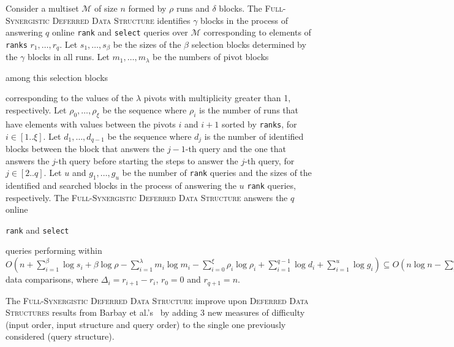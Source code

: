 \begin{INUTILE}
  \begin{theorem}\label{theo:finger}
    Consider a multiset $\mathcal{M}$ of size $n$ formed by $\rho$
    runs and $\delta$ blocks. The \textsc{Full-Synergistic Deferred
      Data Structure} identifies $\gamma$ blocks in the process of
    answering $q$ online \texttt{rank} and \texttt{select} queries
    over $\mathcal{M}$ corresponding to elements of \texttt{ranks}
    $r_1, \dots, r_q$. Let $s_1, \dots, s_{\beta}$ be the sizes of the
    $\beta$ selection blocks determined by the $\gamma$ blocks in all
    runs.  Let $m_1, \dots, m_\lambda$ be the numbers of pivot blocks
    \begin{LONG}
      among this selection blocks
    \end{LONG}
    corresponding to the values of the $\lambda$ pivots with
    multiplicity greater than 1, respectively.  Let
    $\rho_0, \dots, \rho_\xi$ be the sequence where $\rho_i$ is the
    number of runs that have elements with values between the pivots
    $i$ and $i+1$ sorted by \texttt{ranks}, for $i\in[1..\xi]$.  Let
    $d_1, \dots, d_{q-1}$ be the sequence where $d_j$ is the number of
    identified blocks between the block that answers the $j-1$-th
    query and the one that answers the $j$-th query before starting
    the steps to answer the $j$-th query, for $j\in[2..q]$. Let $u$
    and $g_1, \dots, g_u $ be the number of \texttt{rank} queries and
    the sizes of the identified and searched blocks in the process of
    answering the $u$ \texttt{rank} queries, respectively. The
    \textsc{Full-Synergistic Deferred Data Structure} answers the $q$
    online
    \begin{LONG}
      \texttt{rank} and \texttt{select}
    \end{LONG}
    queries performing within
    $O(n + \sum^{\beta}_{i=1}\log{s_i} + \beta\log{\rho} -
    \sum^{\lambda}_{i=1}m_i\log{m_i} -
    \sum^{\xi}_{i=0}\rho_i\log{\rho_i} + \sum^{q-1}_{i=1}\log{d_i} +
    \sum^{u}_{i=1}\log{g_i}) \subseteq O\left(n\log{n} -
      \sum^{q}_{i=0}\Delta_i\log{\Delta_i} + q\log{n}\right)$ data
    comparisons, where $\Delta_i = r_{i+1} - r_i$, $r_0=0$ and
    $r_{q+1}=n$.
  \end{theorem}
\end{INUTILE}

The \textsc{Full-Synergistic Deferred Data Structure} improve upon
\textsc{Deferred Data Structures} results from Barbay et
al.'s~\cite{2016-JDA-NearOptimalOnlineMultiselectionInInternalAndExternalMemory-BarbayGuptaRaoSorenson}
by adding 3 new measures of difficulty (input order, input structure
and query order) to the single one previously considered (query
structure).

